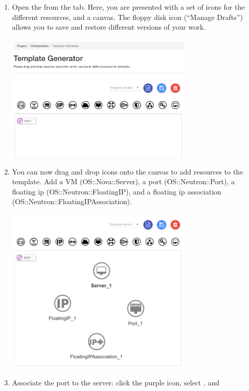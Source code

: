 \begin{enumerate}
\item Open the  from the
   tab.  Here, you are presented with a set of
  icons for the different resources, and a canvas.  The floppy disk
  icon (``Manage Drafts'') allows you to save and restore different
  versions of your work.
  \begin{center}
    \includegraphics[width=0.7\textwidth]{img/template_generator}
  \end{center}
\item You can now drag and drop icons onto the canvas to add resources
  to the template.  Add a VM (OS::Nova::Server), a port
  (OS::Neutron::Port), a floating ip (OS::Neutron::FloatingIP), and a
  floating ip association (OS::Neutron::FloatingIPAssociation).
  \begin{center}
    \includegraphics[width=0.7\textwidth]{img/all_resources}
  \end{center}
\item Associate the port to the server: click the purple
   icon, select , and

\end{enumerate}

